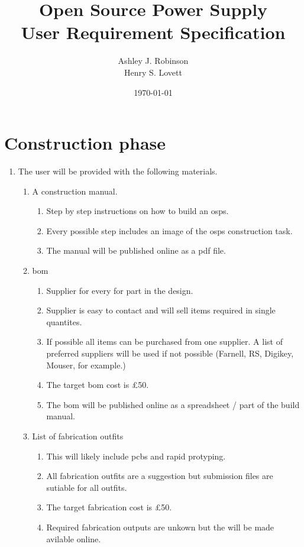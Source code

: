 \documentclass[12pt,a4paper]{article}
\title{Open Source Power Supply\\ User Requirement Specification}
\author{Ashley J. Robinson \\ Henry S. Lovett}
\date{\today}
\begin{document}
\maketitle



\section{Construction phase}
\begin{enumerate}[label*=\arabic*.]
\item The user will be provided with the following materials.
	\begin{enumerate}[label*=\arabic*.]
	\item A construction manual.
		\begin{enumerate}[label*=\arabic*.]
		\item Step by step instructions on how to build an \gls{osps}.
		\item Every possible step includes an image of the \gls{osps} construction task. 
		\item The manual will be published online as a pdf file.
		\end{enumerate}
	\item \gls{bom}
		\begin{enumerate}[label*=\arabic*.]
		\item Supplier for every for part in the design.
		\item Supplier is easy to contact and will sell items required in single quantites.
		\item If possible all items can be purchased from one supplier. A list of preferred suppliers will be used if not possible (Farnell, RS, Digikey, Mouser, for example.)
		\item The target \gls{bom} cost is \pounds50.
		\item The \gls{bom} will be published online as a spreadsheet / part of the build manual.
		\end{enumerate}
	\item List of fabrication outfits
		\begin{enumerate}[label*=\arabic*.]
		\item This will likely include \glspl{pcb} and rapid protyping.
		\item All fabrication outfits are a suggestion but submission files are sutiable for all outfits.
		\item The target fabrication cost is \pounds50.
		\item Required fabrication outputs are unkown but the will be made avilable online.

\end{enumerate}
\end{enumerate}
\end{enumerate}
\end{document}
